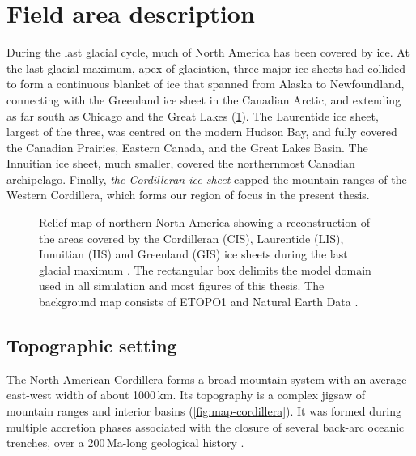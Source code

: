 \documentclass{article}
\newcommand{\chem}[1]{\ensuremath{\mathrm{#1}}}
\begin{document}
\section{Field area description}

During the last glacial cycle, much of North America has been covered by ice.
At the last glacial maximum, apex of glaciation, three major ice sheets had
collided to form a continuous blanket of ice that spanned from Alaska to
Newfoundland, connecting with the Greenland ice sheet in the Canadian Arctic,
and extending as far south as Chicago and the Great Lakes
(\cref{fig:map-northamerica}). The Laurentide ice
sheet, largest of the three, was centred on the modern Hudson Bay,
and fully covered the Canadian Prairies, Eastern Canada, and the Great Lakes
Basin. The Innuitian ice sheet, much smaller, covered the northernmost Canadian
archipelago. Finally, \emph{the Cordilleran ice sheet} capped the mountain
ranges of the Western Cordillera, which forms our region of focus in the
present thesis.

\begin{figure}
  \centering
  \caption{Relief map of northern North America showing a reconstruction of the
           areas covered by the Cordilleran (CIS), Laurentide (LIS), Innuitian
           (IIS) and Greenland (GIS) ice sheets during the last glacial maximum
           \citep[21.4 to 16.8\,cal\,\chem{^{14}C}\,kyr\,BP,][]{Dyke.2004}.
           The rectangular box delimits the model domain used in all simulation
           and most figures of this thesis. The background
           map consists of ETOPO1 \citep{Amante.Eakins.2009} and Natural Earth
           Data \citep{Patterson.Kelso.2014}.}
  \label{fig:map-northamerica}
\end{figure}

\subsection{Topographic setting}

The North American Cordillera forms a broad mountain system with an
average east-west width of about 1000\,km. Its topography is a complex
jigsaw of mountain ranges and interior basins (\cref{fig:map-cordillera}).
It was formed during multiple accretion phases associated with the closure of
several back-arc oceanic trenches, over a 200\,Ma-long geological history
\citep{Sigloch.Mihalynuk.2013}.
\end{document}
